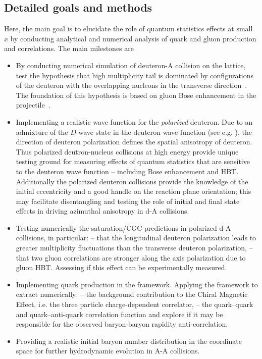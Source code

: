	


    \vspace{0.5em}
    \subsection{Detailed goals and methods}
        \label{sec:p31}

		Here, the main goal is to elucidate the role of quantum statistics effects at small $x$ by 
		conducting analytical and numerical analysis of quark and gluon production and correlations. 
		The main milestones are 
		\begin{itemize}
			\item By conducting 
				numerical simulation of deuteron-A collision 
				on the lattice, test the hypothesis that high multiplicity tail is dominated by 
				configurations of the deuteron with the overlapping nucleons in the transverse direction~\cite{Kovner:2018azs,Mace:2018vwq}. 
				The foundation of this hypothesis is based on gluon Bose enhancement in the projectile~\cite{Mace:2018vwq}.   
			\item Implementing a realistic wave function for the {\it polarized} deuteron. 
				Due to an admixture of the 
				$D$-wave state in the deuteron wave function (see e.g. \myref\cite{Machleidt:2000ge}), 
				the direction of deuteron polarization defines the spatial
				anisotropy of deuteron. Thus polarized deutron-nucleus collisions 
				at high energy provide unique testing ground  for measuring effects of quantum statistics that are  sensitive to the 
				deuteron wave function -- including Bose enhancement and HBT. Additionally  the polarized deuteron collisions 
				provide the knowledge of the initial eccentricity and a good handle on the reaction plane orientation; 
				this may facilitate disentangling and testing the role of initial and final state effects in driving
				azimuthal anisotropy in d-A collisions.
			\item  Testing  numerically the saturation/CGC predictions in polarized d-A collisions, in particular: -- that  the longitudinal 
				deuteron polarization leads to greater multiplicity fluctuations than the transverse deuteron polarization,  --  that 
				two gluon correlations are stronger along the axis polarization due to gluon HBT. Assessing if this effect can be experimentally
				measured.
			\item Implementing quark production in the framework. Applying the framework to extract numerically: -- 
				the background contribution to the Chiral Magnetic Effect, i.e. the three particle charge-dependent correlator, -- 
				the quark--quark and quark--anti-quark correlation function and explore if it may be responsible for the 
				observed baryon-baryon rapidity anti-correlation. 
			\item Providing a realistic 
				initial baryon number  distribution in the coordinate space for further hydrodynamic evolution in A-A collisions. 
		\end{itemize}
		
